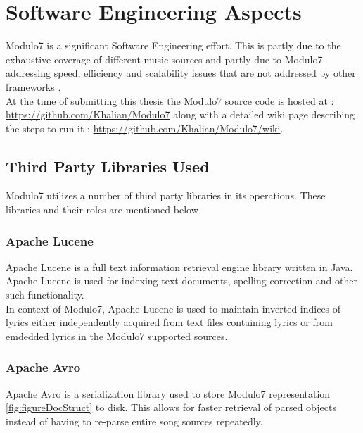 \appendix
{}
\chapter{Software Engineering Aspects}

\noindent Modulo7 is a significant Software Engineering effort. This is partly due to the exhaustive coverage of different music sources and partly due to Modulo7 addressing speed, efficiency and scalability issues that are not addressed by other frameworks \cite{jMIR, humdrum, similie}. \\

\noindent At the time of submitting this thesis the Modulo7 source code is hosted at : \\ \url{https://github.com/Khalian/Modulo7} along with a detailed wiki page describing the steps to run it : \url{https://github.com/Khalian/Modulo7/wiki}. 

\section{Third Party Libraries Used}

\noindent Modulo7 utilizes a number of third party libraries in its operations. These libraries and their roles are mentioned below

\subsection{Apache Lucene} \label{lucene}

\noindent Apache Lucene is a full text information retrieval engine library written in Java. Apache Lucene is used for indexing text documents, spelling correction and other such functionality. \\

\noindent In context of Modulo7, Apache Lucene is used to maintain inverted indices of lyrics either independently acquired from text files containing lyrics or from emdedded lyrics in the Modulo7 supported sources. 

\subsection{Apache Avro} \label{avro}

\noindent Apache Avro is a serialization library used to store Modulo7 representation \ref{fig:figureDocStruct} to disk. This allows for faster retrieval of parsed objects instead of having to re-parse entire song sources repeatedly.

